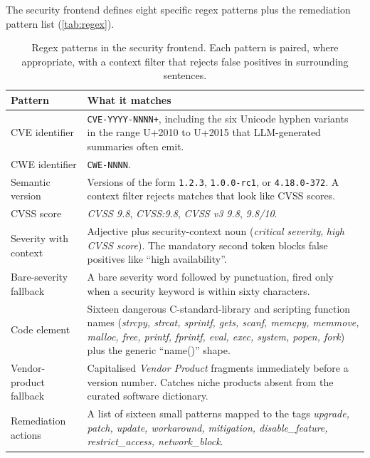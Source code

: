 \documentclass[11pt,a4paper]{article}
\begin{document}
The security frontend defines eight specific regex patterns
plus the remediation pattern list
(\autoref{tab:regex}).

\begin{table}[!htbp]
\centering\small
\begin{tabularx}{\linewidth}{l X}
\toprule
\textbf{Pattern} & \textbf{What it matches} \\
\midrule
CVE identifier &
    \texttt{CVE-YYYY-NNNN+}, including the six Unicode
    hyphen variants in the range U+2010 to U+2015 that
    LLM-generated summaries often emit. \\
CWE identifier &
    \texttt{CWE-NNNN}. \\
Semantic version &
    Versions of the form \texttt{1.2.3}, \texttt{1.0.0-rc1},
    or \texttt{4.18.0-372}. A context filter rejects matches
    that look like CVSS scores. \\
CVSS score &
    \emph{CVSS 9.8}, \emph{CVSS:9.8}, \emph{CVSS v3 9.8},
    \emph{9.8/10}. \\
Severity with context &
    Adjective plus security-context noun (\emph{critical
    severity}, \emph{high CVSS score}). The mandatory
    second token blocks false positives like ``high
    availability''. \\
Bare-severity fallback &
    A bare severity word followed by punctuation, fired
    only when a security keyword is within sixty characters. \\
Code element &
    Sixteen dangerous C-standard-library and scripting
    function names (\emph{strcpy, strcat, sprintf, gets,
    scanf, memcpy, memmove, malloc, free, printf, fprintf,
    eval, exec, system, popen, fork}) plus the generic
    ``name()'' shape. \\
Vendor-product fallback &
    Capitalised \emph{Vendor Product} fragments immediately
    before a version number. Catches niche products absent
    from the curated software dictionary. \\
Remediation actions &
    A list of sixteen small patterns mapped to the tags
    \emph{upgrade, patch, update, workaround, mitigation,
    disable\_feature, restrict\_access, network\_block}. \\
\bottomrule
\end{tabularx}
\caption{Regex patterns in the security frontend. Each
pattern is paired, where appropriate, with a context filter
that rejects false positives in surrounding sentences.}
\label{tab:regex}
\end{table}
\end{document}
